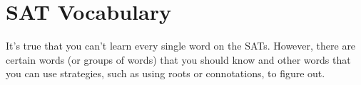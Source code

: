\section{SAT Vocabulary}
It's true that you can't learn every single word on the SATs. However, there are certain words (or groups of words) that you should know and other words that you can use strategies, such as using roots or connotations, to figure out.


